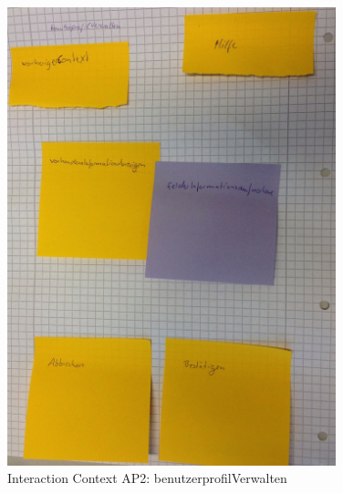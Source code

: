 \begin{figure}[H]
\centering
\includegraphics[angle=90, width=0.85\textwidth] {./images/abstract/version2/benutzerprofilVerwalten.JPG}
\caption{Interaction Context AP2: benutzerprofilVerwalten}
\label{interfaceContents44}
\end{figure}

